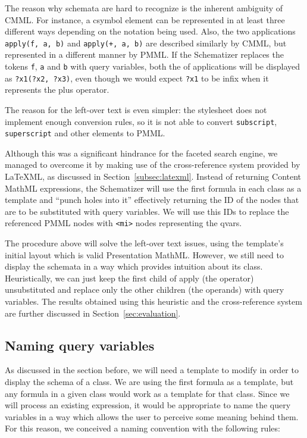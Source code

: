 \documentclass[a4paper,11pt,oneside]{article}
\def\cmml{\textsf{Content MathML}\xspace}
\def\pmml{\textsf{Presentation MathML}\xspace}
\def\latexml{\LaTeX{ML}\xspace}
\begin{document}
The reason why schemata are hard to recognize is the inherent ambiguity of
CMML. For instance, a \textsf{csymbol} element can be represented in at least
three different ways depending on the notation being used. 
Also, the two applications \verb|apply(f, a, b)| and \verb|apply(+, a, b)| are
described similarly by CMML, but represented in a different manner by PMML. If
the Schematizer replaces the tokens \verb|f|, \verb|a| and
\verb|b| with query variables, both the of applications will be displayed as
\verb|?x1(?x2, ?x3)|, even though we would expect \verb|?x1| to be infix
when it represents the plus operator.

The reason for the left-over text is even simpler: the stylesheet does not
implement enough conversion rules, so it is not able to convert
\verb|subscript|, \verb|superscript| and other elements to PMML.

Although this was a significant hindrance for the faceted search engine, we
managed to overcome it by making use of the cross-reference system
provided by \latexml, as discussed in Section~\ref{subsec:latexml}. 
Instead of returning \cmml expressions, the Schematizer will use the first
formula in each class as a template and ``punch holes into
it'' effectively returning the ID of the nodes
that are to be substituted with query variables. We will use this IDs to
replace the referenced PMML nodes with \verb|<mi>| nodes representing the
qvars.

The procedure above will solve the left-over text issues, using the template's
initial layout which is valid \pmml. However, we still need to display the
schemata in a way which provides intuition about its class. Heuristically,
we can just keep the first child of apply (the operator) unsubstituted and
replace only the other children (the operands) with query variables.
The results obtained using this heuristic and the cross-reference system are
further discussed in Section~\ref{sec:evaluation}.

\subsection{Naming query variables}\label{subsec:naming_qvars}
As discussed in the section before, we will need a template to modify in order
to display the schema of a class. We are using the first formula as a template,
but any formula in a given class would work as a template for that class.
Since we will process an existing expression, it would be appropriate to name
the query variables in a way which allows the user to perceive some meaning
behind them. For this reason, we conceived a naming convention with the
following rules:
\end{document}

